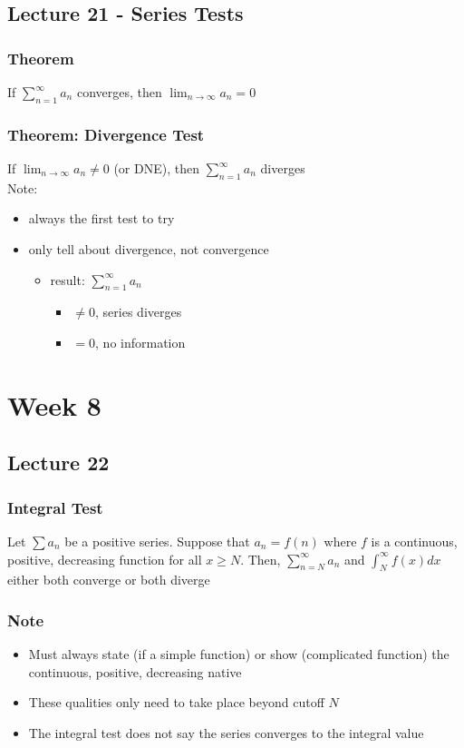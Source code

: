 \documentclass[12pt, letterpaper]{article}
\begin{document}
\subsection{Lecture 21 - Series Tests}
\subsubsection{Theorem}
If $\displaystyle\sum_{n=1}^{\infty}a_n$ converges, then $\displaystyle\lim_{n\to\infty}a_n=0$
\subsubsection{Theorem: Divergence Test}
If $\displaystyle\lim_{n\to\infty}a_n\neq0$ (or DNE), then $\displaystyle\sum_{n=1}^{\infty}a_n$ diverges \\
Note:
\begin{itemize}
    \item always the first test to try 
    \item only tell about divergence, not convergence 
    \begin{itemize}
        \item result: $\displaystyle\sum_{n=1}^{\infty}a_n$ \begin{itemize}
            \item[] $\neq 0$, series diverges 
            \item[] $=0$, no information  
        \end{itemize}
    \end{itemize}
\end{itemize}

\section{Week 8}
\subsection{Lecture 22}
\subsubsection{Integral Test}
Let $\sum a_n$ be a positive series. Suppose that $a_n = f(n)$ where $f$ is a continuous, positive, decreasing function for all $x\geq N$. Then,
$\displaystyle\sum_{n=N}^{\infty}a_n$ and $\displaystyle\int_{N}^{\infty}f(x)dx$ either both converge or both diverge 
\subsubsection*{Note}
\begin{itemize}
    \item Must always state (if a simple function) or show (complicated function) the continuous, positive, decreasing native
    \item These qualities only need to take place beyond cutoff $N$
    \item The integral test does not say the series converges to the integral value
\end{itemize}
\end{document}
